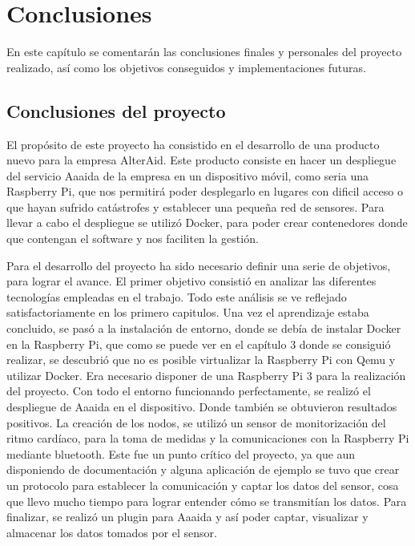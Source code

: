 \cleardoublepage
{}
\chapter*{Conclusiones}

En este capítulo se comentarán las conclusiones finales y personales del proyecto realizado, así como los objetivos conseguidos y implementaciones futuras.


\section{Conclusiones del proyecto}

El propósito de este proyecto ha consistido en el desarrollo de una producto nuevo para la empresa AlterAid. Este producto consiste en hacer un despliegue del servicio Aaaida de la empresa en un dispositivo móvil, como seria una Raspberry Pi, que nos permitirá poder desplegarlo en lugares con dificil acceso o que hayan sufrido catástrofes y establecer una pequeña red de sensores. 
Para llevar a cabo el despliegue se utilizó Docker, para poder crear contenedores donde que contengan el software y nos faciliten la gestión. 

Para el desarrollo del proyecto ha sido necesario definir una serie de objetivos, para lograr el avance. El primer objetivo consistió en analizar las diferentes tecnologías empleadas en el trabajo. Todo este análisis se ve reflejado satisfactoriamente en los primero capitulos. 
Una vez el aprendizaje estaba concluido, se pasó a la instalación de entorno, donde se debía de instalar Docker en la Raspberry Pi, que como se puede ver en el capítulo 3 donde se consiguió realizar, se descubrió que no es posible virtualizar la Raspberry Pi con Qemu y utilizar Docker. Era necesario disponer de una Raspberry Pi 3 para la realización del proyecto. Con todo el entorno funcionando perfectamente, se realizó el despliegue de Aaaida en el dispositivo. Donde también se obtuvieron resultados positivos. La creación de los nodos, se utilizó un sensor de monitorización del ritmo cardíaco, para la toma de medidas y la comunicaciones con la Raspberry Pi mediante bluetooth. Este fue un punto crítico del proyecto, ya que aun disponiendo de documentación y alguna aplicación de ejemplo se tuvo que crear un protocolo para establecer la comunicación y captar los datos del sensor, cosa que llevo mucho tiempo para lograr entender cómo se transmitían los datos. Para finalizar, se realizó un plugin para Aaaida y así poder captar, visualizar y almacenar los datos tomados por el sensor. 

